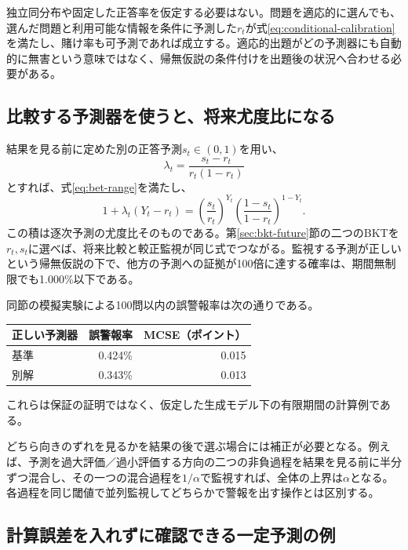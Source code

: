 \documentclass[11pt,a4paper]{article}
\numberwithin{equation}{section}
\begin{document}
独立同分布や固定した正答率を仮定する必要はない。問題を適応的に選んでも、選んだ問題と利用可能な情報を条件に予測した$r_t$が式\eqref{eq:conditional-calibration}を満たし、賭け率も可予測であれば成立する。適応的出題がどの予測器にも自動的に無害という意味ではなく、帰無仮説の条件付けを出題後の状況へ合わせる必要がある。

\subsection{比較する予測器を使うと、将来尤度比になる}

結果を見る前に定めた別の正答予測$s_t\in(0,1)$を用い、
\begin{equation}
\lambda_t=\frac{s_t-r_t}{r_t(1-r_t)}
\end{equation}
とすれば、式\eqref{eq:bet-range}を満たし、
\begin{equation}
1+\lambda_t(Y_t-r_t)=
\left(\frac{s_t}{r_t}\right)^{Y_t}
\left(\frac{1-s_t}{1-r_t}\right)^{1-Y_t}.
\label{eq:bet-LR}
\end{equation}
この積は逐次予測の尤度比そのものである。第\ref{sec:bkt-future}節の二つのBKTを$r_t,s_t$に選べば、将来比較と較正監視が同じ式でつながる。監視する予測が正しいという帰無仮説の下で、他方の予測への証拠が100倍に達する確率は、期間無制限でも1.000\%以下である。

同節の模擬実験による100問以内の誤警報率は次の通りである。
\begin{center}\small
\begin{tabular}{lrr}
\toprule
正しい予測器 & 誤警報率 & MCSE（ポイント）\\
\midrule
基準 & 0.424\% & 0.015\\
別解 & 0.343\% & 0.013\\
\bottomrule
\end{tabular}\end{center}
これらは保証の証明ではなく、仮定した生成モデル下の有限期間の計算例である。

どちら向きのずれを見るかを結果の後で選ぶ場合には補正が必要となる。例えば、予測を過大評価／過小評価する方向の二つの非負過程を結果を見る前に半分ずつ混合し、その一つの混合過程を$1/\alpha$で監視すれば、全体の上界は$\alpha$となる。各過程を同じ閾値で並列監視してどちらかで警報を出す操作とは区別する。

\clearpage
\subsection{計算誤差を入れずに確認できる一定予測の例}
\end{document}

